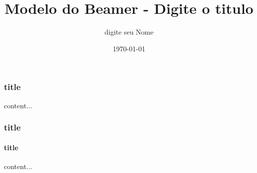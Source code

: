 \documentclass[aspectratio=169]{beamer}
\title[\sc{Texto no rodap\'e}]{Modelo do Beamer - Digite o titulo}
\author[digite seu Nome]{digite seu Nome}
\institute{nome do instituto} %
\date{\today}
\begin{document}
\begin{frame}
\frametitle{title}
content...
\end{frame}

\begin{frame}
\frametitle{title}
\framesubtitle{title}
content...
\end{frame}
\end{document}
